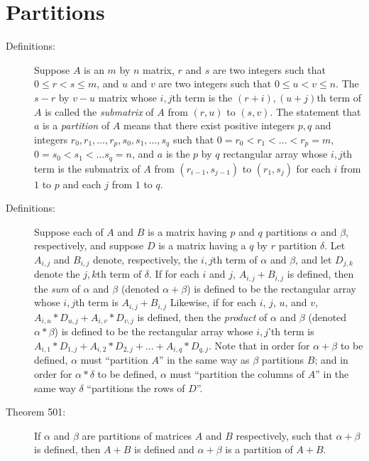 \documentclass{article}
\begin{document}
\section{Partitions}

\begin{description}

  \item[Definitions:] Suppose $A$ is an $m$ by $n$ matrix, $r$ and $s$ are two integers such that $0 \leq r < s \leq m$, and $u$ and $v$ are two integers such that $0 \leq u < v \leq n$. The $s-r$ by $v-u$ matrix whose $i,j$th term is the $(r+i),(u+j)$th term of $A$ is called the \emph{submatrix} of $A$ from $(r,u)$ to $(s,v)$. The statement that $a$ is a \emph{partition} of $A$ means that there exist positive integers $p,q$ and integers $r_{0}, r_{1}, \ldots, r_{p}, s_{0}, s_{1}, \ldots, s_{q}$ such that $0 = r_{0} < r_{1} < \ldots < r_{p}=m$, $0 = s_{0} <s_{1} < \ldots s_{q} = n$, and $a$ is the $p$ by $q$ rectangular array whose $i,j$th term is the submatrix of $A$ from $(r_{i-1},s_{j-1})$ to $(r_{1},s_{j})$ for each $i$ from $1$ to $p$ and each $j$ from $1$ to $q$.

  \item[Definitions:] Suppose each of $A$ and $B$ is a matrix having $p$ and $q$ partitions $\alpha$ and $\beta$, respectively, and suppose $D$ is a matrix having a $q$ by $r$ partition $\delta$. Let $A_{i,j}$ and $B_{i,j}$ denote, respectively, the $i,j$th term of $\alpha$ and $\beta$, and let $D_{j,k}$ denote the $j,k$th term of $\delta$. If for each $i$ and $j$, $A_{i,j}+B_{i,j}$ is defined, then the \emph{sum} of $\alpha$ and $\beta$ (denoted $\alpha + \beta$) is defined to be the rectangular array whose $i,j$th term is $A_{i,j}+B_{i,j}$ Likewise, if for each $i$, $j$, $u$, and $v$, $A_{i,u}*D_{u,j}+A_{i,v}*D_{v,j}$ is defined, then the \emph{product} of $\alpha$ and $\beta$ (denoted $\alpha*\beta$) is defined to be the rectangular array whose $i,j$'th term is $A_{i,1}*D_{1,j}+A_{i,2}*D_{2,j}+ \ldots +A_{i,q}*D_{q,j}$. Note that in order for $\alpha + \beta$ to be defined, $\alpha$ must ``partition $A$'' in the same way as $\beta$ partitions $B$; and in order for $\alpha*\delta$ to be defined, $\alpha$ must ``partition the columns of $A$'' in the same way $\delta$ ``partitions the rows of $D$''.

  \item[Theorem 501:] If $\alpha$ and $\beta$ are partitions of matrices $A$ and $B$ respectively, such that $\alpha + \beta$ is defined, then $A+B$ is defined and $\alpha+\beta$ is a partition of $A+B$.


\end{description}
\end{document}
